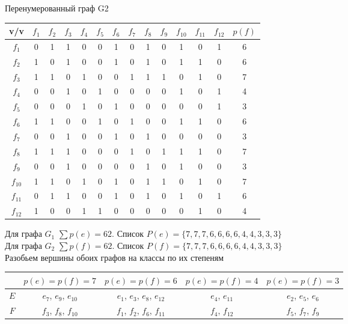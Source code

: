 \documentclass[a4paper,12pt]{article}
\begin{document}
\noindent
Перенумерованный граф G2
\begin{table}[H]
    \centering
    \begin{tabular}{|c|c|c|c|c|c|c|c|c|c|c|c|c|c|}
    \hline
        v/v & $f_1$ & $f_2$ & $f_3$ & $f_4$ & $f_5$ & $f_6$ & $f_7$ & $f_8$ & $f_9$ & $f_{10}$ & $f_{11}$ & $f_{12}$ & $p(f)$ \\ \hline
        $f_1$ & 0 & 1 & 1 & 0 & 0 & 1 & 0 & 1 & 0 & 1 & 0 & 1 & 6 \\ \hline
        $f_2$ & 1 & 0 & 1 & 0 & 0 & 1 & 0 & 1 & 0 & 1 & 1 & 0 & 6 \\ \hline
        $f_3$ & 1 & 1 & 0 & 1 & 0 & 0 & 1 & 1 & 1 & 0 & 1 & 0 & 7 \\ \hline
        $f_4$ & 0 & 0 & 1 & 0 & 1 & 0 & 0 & 0 & 0 & 1 & 0 & 1 & 4 \\ \hline
        $f_5$ & 0 & 0 & 0 & 1 & 0 & 1 & 0 & 0 & 0 & 0 & 0 & 1 & 3 \\ \hline
        $f_6$ & 1 & 1 & 0 & 0 & 1 & 0 & 1 & 0 & 0 & 1 & 1 & 0 & 6 \\ \hline
        $f_7$ & 0 & 0 & 1 & 0 & 0 & 1 & 0 & 1 & 0 & 0 & 0 & 0 & 3 \\ \hline
        $f_8$ & 1 & 1 & 1 & 0 & 0 & 0 & 1 & 0 & 1 & 1 & 1 & 0 & 7 \\ \hline
        $f_9$ & 0 & 0 & 1 & 0 & 0 & 0 & 0 & 1 & 0 & 1 & 0 & 0 & 3 \\ \hline
        $f_{10}$ & 1 & 1 & 0 & 1 & 0 & 1 & 0 & 1 & 1 & 0 & 1 & 0 & 7 \\ \hline
        $f_{11}$ & 0 & 1 & 1 & 0 & 0 & 1 & 0 & 1 & 0 & 1 & 0 & 1 & 6 \\ \hline
        $f_{12}$ & 1 & 0 & 0 & 1 & 1 & 0 & 0 & 0 & 0 & 0 & 1 & 0 & 4 \\ \hline
    \end{tabular}
\end{table}

\noindent
Для графа $G_1$ $\sum p(e) = 62$. Список $P(e) = \{7,7,7,6,6,6,6,4,4,3,3,3\}$ \\
Для графа $G_2$ $\sum p(f) = 62$. Список $P(f) = \{7,7,7,6,6,6,6,4,4,3,3,3\}$ \\

\noindent
Разобьем вершины обоих графов на классы по их степеням
\begin{table}[H]
    \centering
    \begin{tabular}{|c|c|c|c|c|}
    \hline
         & $p(e)=p(f)=7$ & $p(e)=p(f)=6$ & $p(e)=p(f)=4$ & $p(e)=p(f)=3$ \\ \hline
        $E$ & $e_7$, $e_9$, $e_{10}$ & $e_1$, $e_3$, $e_8$, $e_{12}$ & $e_4$, $e_{11}$ & $e_2$, $e_5$, $e_6$ \\ \hline
        $F$ & $f_3$, $f_8$, $f_{10}$ & $f_1$, $f_2$, $f_6$, $f_{11}$ & $f_4$, $f_{12}$ & $f_5$, $f_7$, $f_9$ \\ \hline
    \end{tabular}
\end{table}
\end{document}
